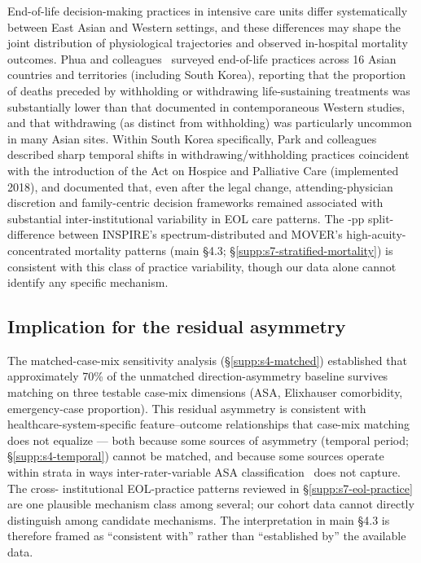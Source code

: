 \documentclass[11pt,a4paper]{article}
\begin{document}
End-of-life decision-making practices in intensive care units differ
systematically between East Asian and Western settings, and these
differences may shape the joint distribution of physiological
trajectories and observed in-hospital mortality outcomes. Phua and
colleagues~\cite{Phua2015} surveyed end-of-life practices across 16 Asian
countries and territories (including South Korea), reporting that the
proportion of deaths preceded by withholding or withdrawing
life-sustaining treatments was substantially lower than that documented
in contemporaneous Western studies, and that withdrawing (as distinct
from withholding) was particularly uncommon in many Asian sites. Within
South Korea specifically, Park and colleagues~\cite{Park2018} described
sharp temporal shifts in withdrawing/withholding practices coincident
with the introduction of the Act on Hospice and Palliative Care
(implemented 2018), and documented that, even after the legal change,
attending-physician discretion and family-centric decision frameworks
remained associated with substantial inter-institutional variability in
EOL care patterns. The \pnMortalitySplitDifferencePp-pp split-difference
between INSPIRE's spectrum-distributed and MOVER's high-acuity-concentrated
mortality patterns (main \S4.3; \S\ref{supp:s7-stratified-mortality}) is
consistent with this class of practice variability, though our data alone
cannot identify any specific mechanism.

\subsection{Implication for the residual asymmetry}\label{supp:s7-residual}

The matched-case-mix sensitivity analysis (\S\ref{supp:s4-matched})
established that approximately 70\% of the unmatched
direction-asymmetry baseline survives matching on three testable
case-mix dimensions (ASA, Elixhauser comorbidity, emergency-case
proportion). This residual asymmetry is consistent with
healthcare-system-specific feature--outcome relationships that case-mix
matching does not equalize --- both because some sources of asymmetry
(temporal period; \S\ref{supp:s4-temporal}) cannot be matched, and
because some sources operate within strata in ways inter-rater-variable
ASA classification~\cite{Sankar2014} does not capture. The cross-
institutional EOL-practice patterns reviewed in
\S\ref{supp:s7-eol-practice} are one plausible mechanism class among
several; our cohort data cannot directly distinguish among candidate
mechanisms. The interpretation in main
\S4.3 is therefore framed as ``consistent with'' rather than
``established by'' the available data.
\end{document}
